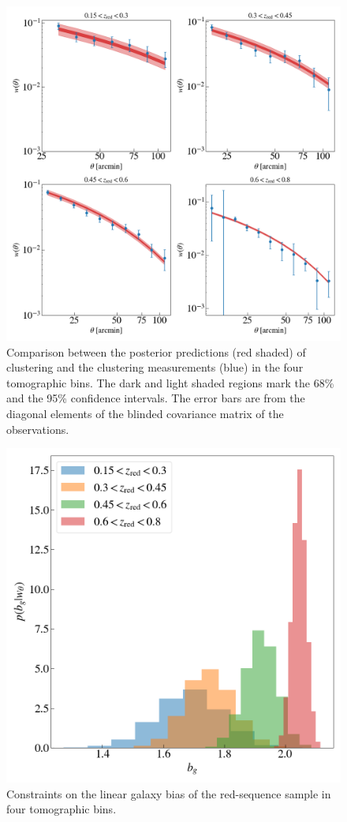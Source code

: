 \documentclass[fleqn,usenatbib,useAMS]{mnras}
\begin{document}
\begin{figure}
\includegraphics[width=\textwidth]{figures_tmp/w_estimate.png}
\caption{\label{fig:w_estimate} Comparison between the posterior predictions (red shaded) of clustering and the clustering measurements (blue) in the four tomographic bins. The dark and light shaded regions mark the 68\% and the 95\% confidence intervals. The error bars are from the diagonal elements of the blinded covariance matrix of the observations.} 
\end{figure}


\begin{figure}
\includegraphics[width=\columnwidth]{figures_tmp/b_estimate.png}
\caption{\label{fig:b_estimate} Constraints on the linear galaxy bias of the red-sequence sample in four tomographic bins.} 
\end{figure}
\end{document}
